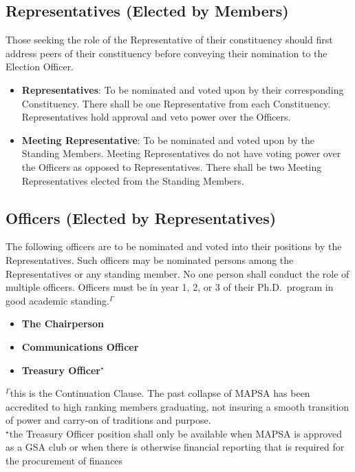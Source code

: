 \documentclass[8pt]{article}
\begin{document}
	\subsection{Representatives (Elected by Members)}\label{subsec:rep}
	Those seeking the role of the Representative of their constituency should first address peers of their constituency before conveying their nomination to the Election Officer. 
	\begin{itemize}
		\item \textbf{Representatives}: To be nominated and voted upon by their corresponding Constituency. There shall be one Representative from each Constituency. Representatives hold approval and veto power over the Officers.
		\item \textbf{Meeting Representative}: To be nominated and voted upon by the Standing Members. Meeting Representatives do not have voting power over the Officers as opposed to Representatives. There shall be two Meeting Representatives elected from the Standing Members.
	\end{itemize}
	\subsection{Officers (Elected by Representatives)}\label{subsec:off}
	The following officers are to be nominated and voted into their positions by the Representatives. Such officers may be nominated persons among the Representatives or any standing member. No one person shall conduct the role of multiple officers. Officers must be in year 1, 2, or 3 of their Ph.D.~program in good academic standing.$^\Gamma$
	\begin{itemize}
		\item \textbf{The Chairperson}
		\item \textbf{Communications Officer}
		\item \textbf{Treasury Officer$^\star$}
	\end{itemize}
	$^\Gamma$this is the Continuation Clause. The past collapse of MAPSA has been accredited to high ranking members graduating, not insuring a smooth transition of power and carry-on of traditions and purpose.\\
	$^\star$the Treasury Officer position shall only be available when MAPSA is approved as a GSA club or when there is otherwise financial reporting that is required for the procurement of finances\\
\end{document}
